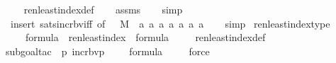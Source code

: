 \begin{isabellebody}
\ \ %
\endisadelimproof
%
\isatagproof
{}\isamarkupfalse%
\ ren{\isacharunderscore}{\kern0pt}least{\isacharunderscore}{\kern0pt}index{\isacharunderscore}{\kern0pt}def\isanewline
\ \ \isamarkupfalse%
\ assms\isanewline
\ \ \isamarkupfalse%
\ simp\isanewline
\ \ \isamarkupfalse%
\ {\isacharparenleft}{\kern0pt}insert\ sats{\isacharunderscore}{\kern0pt}incr{\isacharunderscore}{\kern0pt}bv{\isacharunderscore}{\kern0pt}iff\ {\isacharbrackleft}{\kern0pt}of\ {\isacharunderscore}{\kern0pt}\ {\isacharunderscore}{\kern0pt}\ M\ {\isacharunderscore}{\kern0pt}\ {\isachardoublequoteopen}{\isacharbrackleft}{\kern0pt}a{}{\isacharcomma}{\kern0pt}\ a{}{\isacharcomma}{\kern0pt}\ a{}{\isacharcomma}{\kern0pt}\ a{}{}{\isacharcomma}{\kern0pt}\ a{}{}{\isacharcomma}{\kern0pt}\ a{}{\isacharcomma}{\kern0pt}\ a{}{\isacharbrackright}{\kern0pt}{\isachardoublequoteclose}{\isacharbrackright}{\kern0pt}{\isacharparenright}{\kern0pt}\isanewline
\ \ \isamarkupfalse%
\ simp%
\endisatagproof
{\isafoldproof}%
%
\isadelimproof
\isanewline
%
\endisadelimproof
\isanewline
{}\isamarkupfalse%
\ ren{\isacharunderscore}{\kern0pt}least{\isacharunderscore}{\kern0pt}index{\isacharunderscore}{\kern0pt}type\ {\isacharcolon}{\kern0pt}\ \isanewline
\ \ {\isachardoublequoteopen}{\isasymphi}\ {\isasymin}\ formula\ {\isasymLongrightarrow}\ ren{\isacharunderscore}{\kern0pt}least{\isacharunderscore}{\kern0pt}index{\isacharparenleft}{\kern0pt}{\isasymphi}{\isacharparenright}{\kern0pt}\ {\isasymin}\ formula{\isachardoublequoteclose}\ \isanewline
%
\isadelimproof
\ \ %
\endisadelimproof
%
\isatagproof
{}\isamarkupfalse%
\ ren{\isacharunderscore}{\kern0pt}least{\isacharunderscore}{\kern0pt}index{\isacharunderscore}{\kern0pt}def\ \isanewline
\isanewline
\ \ \isamarkupfalse%
{\isacharparenleft}{\kern0pt}subgoal{\isacharunderscore}{\kern0pt}tac\ {\isachardoublequoteopen}\ {\isacharparenleft}{\kern0pt}{\isasymlambda}p{\isachardot}{\kern0pt}\ incr{\isacharunderscore}{\kern0pt}bv{\isacharparenleft}{\kern0pt}p{\isacharparenright}{\kern0pt}\ {\isacharbackquote}{\kern0pt}\ {}{\isacharparenright}{\kern0pt}{\isacharcircum}{\kern0pt}{}{}\ {\isacharparenleft}{\kern0pt}{\isasymphi}{\isacharparenright}{\kern0pt}\ {\isasymin}\ formula{\isachardoublequoteclose}{\isacharparenright}{\kern0pt}\isanewline
\ \ \ \isamarkupfalse%
\ force\ \isanewline

\end{isabellebody}
